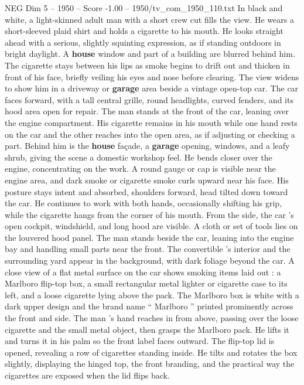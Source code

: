 \begin{textsample}{NEG Dim 5 – 1950 – Score -1.00 – 1950/tv\_com\_1950\_110.txt}  \label{ex:f5_neg_025}
In black and white, a light-skinned adult man with a short crew cut fills the view.
He wears a short-sleeved plaid shirt and holds a cigarette to his mouth.
He looks straight ahead with a serious, slightly squinting expression, as if standing outdoors in bright daylight.
A \textbf{house} window and part of a building are blurred behind him.
The cigarette stays between his lips as smoke begins to drift out and thicken in front of his face, briefly veiling his eyes and nose before clearing.
The view widens to show him in a driveway or \textbf{garage} area beside a vintage open-top car.
The car faces forward, with a tall central grille, round headlights, curved fenders, and its hood area open for repair.
The man stands at the front of the car, leaning over the engine compartment.
His cigarette remains in his mouth while one hand rests on the car and the other reaches into the open area, as if adjusting or checking a part.
Behind him is the \textbf{house} façade, a \textbf{garage} opening, windows, and a leafy shrub, giving the scene a domestic workshop feel.
He bends closer over the engine, concentrating on the work.
A round gauge or cap is visible near the engine area, and dark smoke or cigarette smoke curls upward near his face.
His posture stays intent and absorbed, shoulders forward, head tilted down toward the car.
He continues to work with both hands, occasionally shifting his grip, while the cigarette hangs from the corner of his mouth.
From the side, the car ’s open cockpit, windshield, and long hood are visible.
A cloth or set of tools lies on the louvered hood panel.
The man stands beside the car, leaning into the engine bay and handling small parts near the front.
The convertible ’s interior and the surrounding yard appear in the background, with dark foliage beyond the car.
A close view of a flat metal surface on the car shows smoking items laid out : a Marlboro flip-top box, a small rectangular metal lighter or cigarette case to its left, and a loose cigarette lying above the pack.
The Marlboro box is white with a dark upper design and the brand name “ Marlboro ” printed prominently across the front and side.
The man ’s hand reaches in from above, passing over the loose cigarette and the small metal object, then grasps the Marlboro pack.
He lifts it and turns it in his palm so the front label faces outward.
The flip-top lid is opened, revealing a row of cigarettes standing inside.
He tilts and rotates the box slightly, displaying the hinged top, the front branding, and the practical way the cigarettes are exposed when the lid flips back.

\end{textsample}
